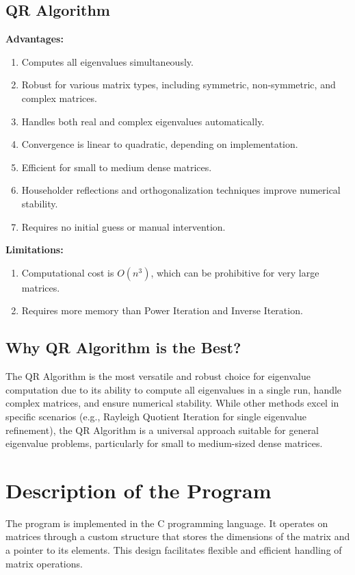 \documentclass[12pt]{article}
\begin{document}
\subsection*{QR Algorithm}
\textbf{Advantages:}
\begin{enumerate}
    \item Computes all eigenvalues simultaneously.
    \item Robust for various matrix types, including symmetric, non-symmetric, and complex matrices.
    \item Handles both real and complex eigenvalues automatically.
    \item Convergence is linear to quadratic, depending on implementation.
    \item Efficient for small to medium dense matrices.
    \item Householder reflections and orthogonalization techniques improve numerical stability.
    \item Requires no initial guess or manual intervention.
\end{enumerate}
\textbf{Limitations:}
\begin{enumerate}
    \item Computational cost is \(O(n^3)\), which can be prohibitive for very large matrices.
    \item Requires more memory than Power Iteration and Inverse Iteration.
\end{enumerate}

\subsection*{Why QR Algorithm is the Best?}
The QR Algorithm is the most versatile and robust choice for eigenvalue computation due to its ability to compute all eigenvalues in a single run, handle complex matrices, and ensure numerical stability. While other methods excel in specific scenarios (e.g., Rayleigh Quotient Iteration for single eigenvalue refinement), the QR Algorithm is a universal approach suitable for general eigenvalue problems, particularly for small to medium-sized dense matrices.

\section{Description of the Program}

The program is implemented in the C programming language. It operates on matrices through a custom structure that stores the dimensions of the matrix and a pointer to its elements. This design facilitates flexible and efficient handling of matrix operations.
\end{document}
